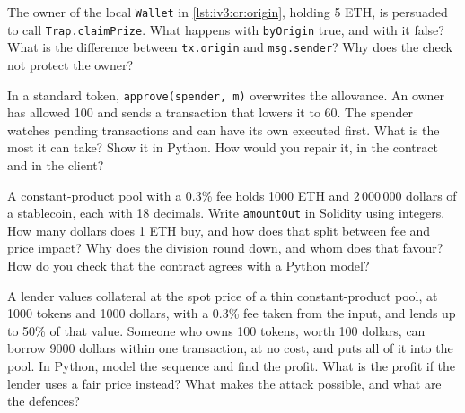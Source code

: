 \begin{question}\label{iq:iv3:smart-contracts-and-crypto-engineering:12}
The owner of the local \texttt{Wallet} in \cref{lst:iv3:cr:origin}, holding 5 ETH, is persuaded to call \texttt{Trap.claimPrize}. What happens with \texttt{byOrigin} true, and with it false? What is the difference between \texttt{tx.origin} and \texttt{msg.sender}? Why does the check not protect the owner?
\label{lst:iv3:cr:origin}
\end{question}

\begin{question}\label{iq:iv3:smart-contracts-and-crypto-engineering:13}
In a standard token, \texttt{approve(spender, m)} overwrites the allowance. An owner has allowed 100 and sends a transaction that lowers it to 60. The spender watches pending transactions and can have its own executed first. What is the most it can take? Show it in Python. How would you repair it, in the contract and in the client?
\end{question}

\begin{question}\label{iq:iv3:smart-contracts-and-crypto-engineering:14}
A constant-product pool with a 0.3\% fee holds 1000 ETH and 2\,000\,000 dollars of a stablecoin, each with 18 decimals. Write \texttt{amountOut} in Solidity using integers. How many dollars does 1 ETH buy, and how does that split between fee and price impact? Why does the division round down, and whom does that favour? How do you check that the contract agrees with a Python model?
\end{question}

\begin{question}\label{iq:iv3:smart-contracts-and-crypto-engineering:15}
A lender values collateral at the spot price of a thin constant-product pool, at 1000 tokens and 1000 dollars, with a 0.3\% fee taken from the input, and lends up to 50\% of that value. Someone who owns 100 tokens, worth 100 dollars, can borrow 9000 dollars within one transaction, at no cost, and puts all of it into the pool. In Python, model the sequence and find the profit. What is the profit if the lender uses a fair price instead? What makes the attack possible, and what are the defences?
\end{question}

